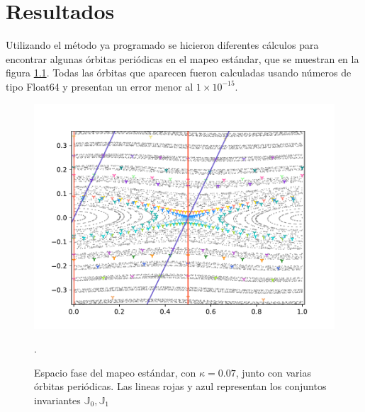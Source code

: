 
\chapter{Resultados}

Utilizando el método ya programado se hicieron diferentes cálculos para encontrar algunas \'orbitas peri\'odicas en el mapeo est\'andar, que se muestran en la figura \ref{orbitasperiodicasestandarvarios}. Todas las \'orbitas que aparecen fueron calculadas usando n\'umeros de tipo \textrm{Float64} y presentan un error menor al $1\times10^{-15}$.
\begin{figure}[H]
	\centering
	\includegraphics[scale= 0.7]{EstandarOP07}
	\caption{Espacio fase del mapeo est\'andar, con $\kappa = 0.07$, junto con varias \'orbitas peri\'odicas. Las lineas rojas y azul representan los conjuntos invariantes $\mathbb{J}_{0},\mathbb{J}_{1}$}.
	\label{orbitasperiodicasestandarvarios}
\end{figure}
